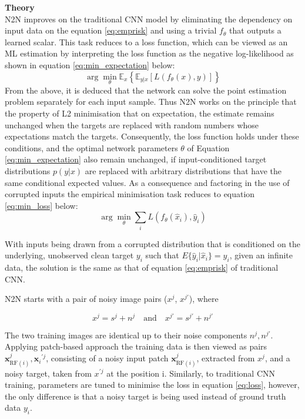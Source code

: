 \textbf{Theory}\\
N2N improves on the traditional CNN model by eliminating the dependency on input data on the equation \ref{eq:emprisk} and using a trivial $f_{\theta}$ that outputs a learned scalar. This task reduces to a loss function, which can be viewed as an \gls{ML} estimation by interpreting the loss function as the negative log-likelihood as shown in equation \ref{eq:min_expectation} below:
\begin{equation}
	\arg\min_{\theta} \mathbb{E}_{x} \left\{ \mathbb{E}_{y|x} \left[ L(f_{\theta}(x), y) \right] \right\}
	\label{eq:min_expectation}
\end{equation}
From the above, it is deduced that the network can solve the point estimation problem separately for each input sample. Thus \gls{N2N} works on the principle that the property of L2 minimisation that on expectation, the estimate remains unchanged when the targets are replaced with random numbers whose expectations match the targets. Consequently, the loss function holds under these conditions, and the optimal network parameters $\theta$ of Equation \ref{eq:min_expectation} also remain unchanged, if input-conditioned target distributions $p(y|x)$  are replaced with arbitrary distributions that have the same conditional expected values.  As a consequence and  factoring in the use of corrupted inputs the empirical minimisation task reduces to equation \ref{eq:min_loss} below:
\begin{equation}
	\arg\min_{\theta} \sum_{i} L\left( f_{\theta}(\hat{x}_i), \hat{y}_i \right)
	\label{eq:min_loss}
\end{equation}

With inputs being drawn from a corrupted distribution that is conditioned on the underlying, unobserved clean target $y_i$ such that  $E\{\hat{y}_i|\hat{x}_i\} = y_i$, given an infinite data, the solution is the same as that of equation \ref{eq:emprisk} of traditional \gls{CNN}.

\gls{N2N}  starts with  a pair of  noisy image pairs  ($x^j$, $x^{j'}$), where

\begin{equation}
	x^j = s^j + n^j \quad \text{and} \quad x^{j'} = s^{j'} + n^{j'}
	\label{eq:noisemodel}
\end{equation}

The two training images are identical up to their noise components $n^j, n^{j'}$. Applying patch-based approach the training data is then viewed as pairs ${\mathbf{x}}_{{\text{RF}}(i)}^j, {{\mathbf{x}}_i}^{'j}$, consisting of a noisy input patch ${\mathbf{x}}_{{\text{RF}}(i)}^j$, extracted from $x^j$, and a noisy target, taken from $x^{'j}$ at the position i. Similarly, to traditional \gls{CNN} training, parameters are tuned to minimise the loss in equation \ref{eq:loss}, however, the only difference is that a noisy target is being used instead of ground truth data $y_i$. 

